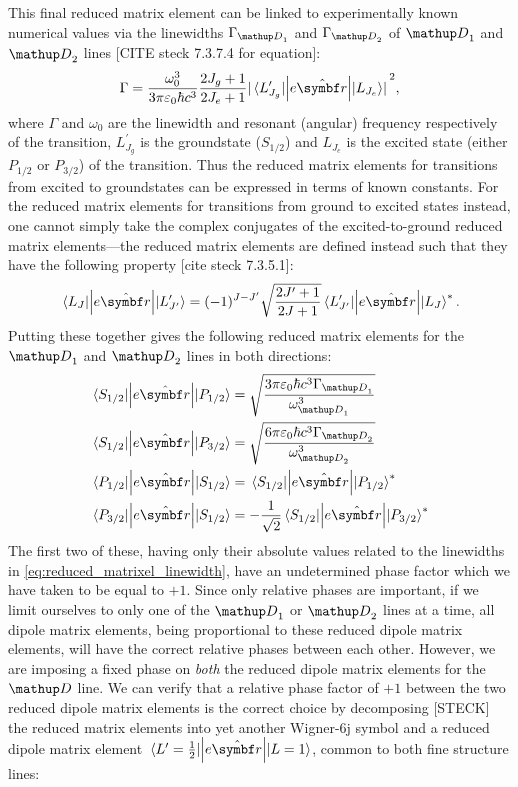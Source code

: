 This final reduced matrix element can be linked to experimentally known numerical values via the linewidths $\Gamma_{\up{D}_1}$ and $\Gamma_{\up{D}_2}$ of $\up{D}_1$ and $\up{D}_2$ lines [CITE steck 7.3.7.4 for equation]:
\begin{align}\label{eq:reduced_matrixel_linewidth}
\Gamma = \frac{\omega_0^3}{3\pi\varepsilon_0\hbar c^3}\frac{2J_g + 1}{2J_e + 1}\abs{\matrixel{L^\prime_{J_g}}{\left|e\hat{\vec r}\right|}{L_{J_e}}}^2,
\end{align}
where $\Gamma$ and $\omega_0$ are the linewidth and resonant (angular) frequency respectively of the transition, $L^\prime_{J_g}$ is the groundstate ($S_{1/2}$) and $L_{J_e}$ is the excited state (either $P_{1/2}$ or ${P_{3/2}}$) of the transition. Thus the reduced matrix elements for transitions from excited to groundstates can be expressed in terms of known constants. For the reduced matrix elements for transitions from ground to excited states instead, one cannot simply take the complex conjugates of the excited-to-ground reduced matrix elements---the reduced matrix elements are defined instead such that they have the following property [cite steck 7.3.5.1]:
\begin{align}
\matrixel{L_J}{\left|e\hat{\vec r}\right|}{L^\prime_{J^\prime}}
= (-1)^{J - J^\prime}\sqrt{\frac{2J^\prime+1}{2J+1}}
\matrixel{L^\prime_{J^\prime}}{\left|e\hat{\vec r}\right|}{L_J}^*.
\end{align}
Putting these together gives the following reduced matrix elements for the $\up{D}_1$ and $\up{D}_2$ lines in both directions:
\begin{align}
\matrixel{S_{1/2}}{\left|e\hat{\vec r}\right|}{P_{1/2}}
&= \sqrt{\frac{3\pi\varepsilon_0\hbar c^3 \Gamma_{\up{D}_1}}{\omega_{\up{D}_1}^3}}\\
\matrixel{S_{1/2}}{\left|e\hat{\vec r}\right|}{P_{3/2}}
&= \sqrt{\frac{6\pi\varepsilon_0\hbar c^3 \Gamma_{\up{D}_2}}{\omega_{\up{D}_2}^3}}\\
\matrixel{P_{1/2}}{\left|e\hat{\vec r}\right|}{S_{1/2}}
&= \matrixel{S_{1/2}}{\left|e\hat{\vec r}\right|}{P_{1/2}}^*\\
\matrixel{P_{3/2}}{\left|e\hat{\vec r}\right|}{S_{1/2}}
&= -\frac1{\sqrt2}\matrixel{S_{1/2}}{\left|e\hat{\vec r}\right|}{P_{3/2}}^*
\end{align}
The first two of these, having only their absolute values related to the linewidths in \eqref{eq:reduced_matrixel_linewidth}, have an undetermined phase factor which we have taken to be equal to $+1$. Since only relative phases are important, if we limit ourselves to only one of the $\up{D}_1$ or $\up{D}_2$ lines at a time, all dipole matrix elements, being proportional to these reduced dipole matrix elements, will have the correct relative phases between each other. However, we are imposing a fixed phase on \emph{both} the reduced dipole matrix elements for the $\up{D}$ line. We can verify that a relative phase factor of $+1$ between the two reduced dipole matrix elements is the correct choice by decomposing [STECK] the reduced matrix elements into yet another Wigner-6j symbol and a reduced dipole matrix element $\matrixel{L^\prime=\frac12}{\left|e\hat{\vec r}\right|}{L=1}$, common to both fine structure lines:
